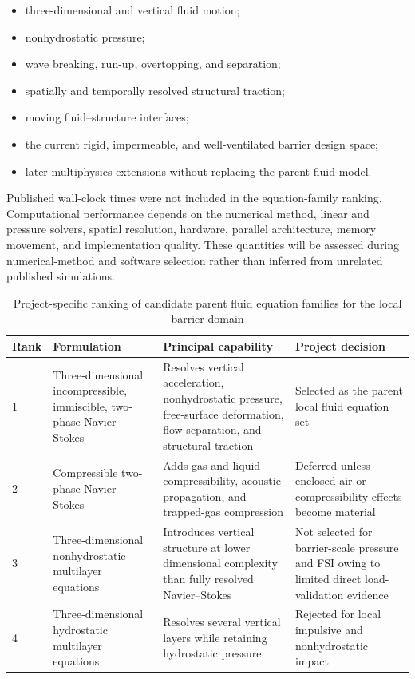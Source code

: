 \begin{itemize}
  \item three-dimensional and vertical fluid motion;
  \item nonhydrostatic pressure;
  \item wave breaking, run-up, overtopping, and separation;
  \item spatially and temporally resolved structural traction;
  \item moving fluid--structure interfaces;
  \item the current rigid, impermeable, and well-ventilated barrier
    design space;
  \item later multiphysics extensions without replacing the parent
    fluid model.
\end{itemize}

Published wall-clock times were not included in the equation-family
ranking. Computational performance depends on the numerical method,
linear and pressure solvers, spatial resolution, hardware, parallel
architecture, memory movement, and implementation quality. These
quantities will be assessed during numerical-method and software
selection rather than inferred from unrelated published simulations.

\begin{table}[htbp]
  \centering
  \small
  \renewcommand{\arraystretch}{1.25}
  \begin{tabular}{
      p{}
      p{}
      p{}
      p{}
    }
    \hline
    Rank
    &
    Formulation
    &
    Principal capability
    &
    Project decision
    \\
    \hline
    1
    &
    Three-dimensional incompressible, immiscible,
    two-phase Navier--Stokes
    &
    Resolves vertical acceleration, nonhydrostatic pressure,
    free-surface deformation, flow separation, and structural
    traction
    &
    Selected as the parent local fluid equation set
    \\
    2
    &
    Compressible two-phase Navier--Stokes
    &
    Adds gas and liquid compressibility, acoustic propagation,
    and trapped-gas compression
    &
    Deferred unless enclosed-air or compressibility effects become
    material
    \\
    3
    &
    Three-dimensional nonhydrostatic multilayer equations
    &
    Introduces vertical structure at lower dimensional complexity
    than fully resolved Navier--Stokes
    &
    Not selected for barrier-scale pressure and FSI owing to
    limited direct load-validation evidence
    \\
    4
    &
    Three-dimensional hydrostatic multilayer equations
    &
    Resolves several vertical layers while retaining hydrostatic
    pressure
    &
    Rejected for local impulsive and nonhydrostatic impact
    \\
    \hline
  \end{tabular}
  \caption{Project-specific ranking of candidate parent fluid
  equation families for the local barrier domain}
  \label{tab:res-mod-eqs-local-parent-ranking}
\end{table}

